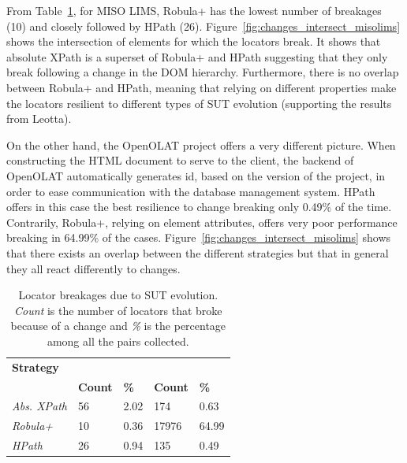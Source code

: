From Table~\ref{tab:locator_breakage}, for MISO LIMS, Robula+ has the lowest number of breakages (10) and closely followed by HPath (26). Figure~\ref{fig:changes_intersect_misolims} shows the intersection of elements for which the locators break. It shows that absolute XPath is a superset of Robula+ and HPath suggesting that they only break following a change in the DOM hierarchy. Furthermore, there is no overlap between Robula+ and HPath, meaning that relying on different properties make the locators resilient to different types of SUT evolution (supporting the results from Leotta\etal\cite{Leotta2015}).

On the other hand, the OpenOLAT project offers a very different picture. When constructing the HTML document to serve to the client, the backend of OpenOLAT automatically generates id, based on the version of the project, in order to ease communication with the database management system. HPath offers in this case the best resilience to change breaking only 0.49\% of the time. Contrarily, Robula+, relying on element attributes, offers very poor performance breaking in 64.99\% of the cases. Figure~\ref{fig:changes_intersect_misolims} shows that there exists an overlap between the different strategies but that in general they all react differently to changes.

\begin{table}
\caption{Locator breakages due to SUT evolution. \emph{Count} is the number of locators that broke because of a change and \emph{\%} is the percentage among all the pairs collected.}
\label{tab:locator_breakage}
\begin{center}
\begin{tabular}{>{\raggedright}m{0.6in}>{\raggedleft}m{0.4in} >{\raggedleft}m{0.2in}>{\raggedleft}m{0.4in} >{\raggedleft}m{0.2in}}
\toprule
\textbf{\scriptsize{Strategy}} & \multicolumn{2}{c}{\textbf{\scriptsize{MISO LIMS}}} & \multicolumn{2}{c}{\textbf{\scriptsize{OpenOLAT}}}\tabularnewline
    & \textbf{\scriptsize{Count}} & \textbf{\scriptsize{\%}} & \textbf{\scriptsize{Count}} & \textbf{\scriptsize{\%}}\tabularnewline
\toprule
\scriptsize{\textit{Abs. XPath}} & \scriptsize{56} & \scriptsize{2.02} & \scriptsize{174} & \scriptsize{0.63}\tabularnewline
\scriptsize{\textit{Robula+}} & \scriptsize{10} & \scriptsize{0.36} & \scriptsize{17976} & \scriptsize{64.99}\tabularnewline
\scriptsize{\textit{HPath}} & \scriptsize{26} & \scriptsize{0.94} & \scriptsize{135} & \scriptsize{0.49}\tabularnewline
\bottomrule
\end{tabular}
\end{center}
\end{table}

